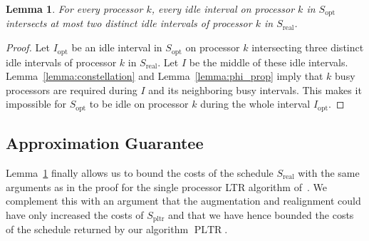 \documentclass[a4paper]{article}
\DeclareMathOperator{\opt}{opt}
\DeclareMathOperator{\pltr}{pltr}
\DeclareMathOperator{\PLTR}{PLTR}
\DeclareMathOperator{\real}{real}
\newtheorem{lemma}[theorem]{Lemma}
\begin{document}
\begin{lemma}\label{lemma:intersection}
  For every processor $k$, every idle interval on processor $k$ in $S_{\opt}$ intersects at most two distinct idle intervals of processor $k$ in $S_{\real}$.
\end{lemma}
\begin{proof}
  Let $I_{\opt}$ be an idle interval in $S_{\opt}$ on processor $k$ intersecting three distinct idle intervals of processor $k$ in $S_{\real}$.
  Let $I$ be the middle of these idle intervals.
  Lemma~\ref{lemma:constellation} and Lemma~\ref{lemma:phi_prop} imply that $k$ busy processors are required during $I$ and its neighboring busy intervals.
  This makes it impossible for $S_{\opt}$ to be idle on processor $k$ during the whole interval $I_{\opt}$.
\end{proof}

\subsection{Approximation Guarantee}
Lemma~\ref{lemma:intersection} finally allows us to bound the costs of the schedule $S_{\real}$ with the same arguments as in the proof for the single processor LTR algorithm of~\cite{irani_left_to_right_soda_2003}.
We complement this with an argument that the augmentation and realignment could have only increased the costs of $S_{\pltr}$ and that we have hence bounded the costs of the schedule returned by our algorithm $\PLTR$.
\end{document}
